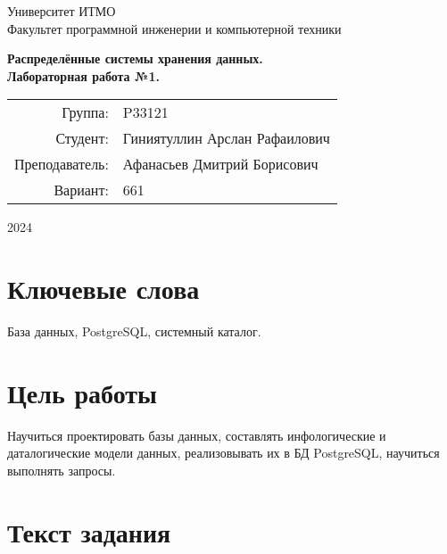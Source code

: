 \documentclass{article}
\begin{document}
\begin{titlepage}
    \begin{center}
        \begin{spacing}{1.4}
            \large{Университет ИТМО} \\
            \large{Факультет программной инженерии и компьютерной техники} \\
        \end{spacing}
        \vfill
        \textbf{
            \huge{Распределённые системы хранения данных.} \\
            \huge{Лабораторная работа №1.} \\
        }
    \end{center}
    \vfill
    \begin{center}
        \begin{tabular}{r l}
            Группа:        & P33121                      \\
            Студент:       & Гиниятуллин Арслан Рафаилович     \\
            Преподаватель: & Афанасьев Дмитрий Борисович \\
            Вариант:       & 661                         \\
        \end{tabular}
    \end{center}
    \vfill
    \begin{center}
        \begin{large}
            2024
        \end{large}
    \end{center}
\end{titlepage}

\section*{Ключевые слова}

База данных, PostgreSQL, системный каталог.

\tableofcontents

\section{Цель работы}

Научиться проектировать базы данных, составлять инфологические и даталогические модели данных, реализовывать их в БД PostgreSQL, научиться выполнять запросы.

\section{Текст задания}
\end{document}
